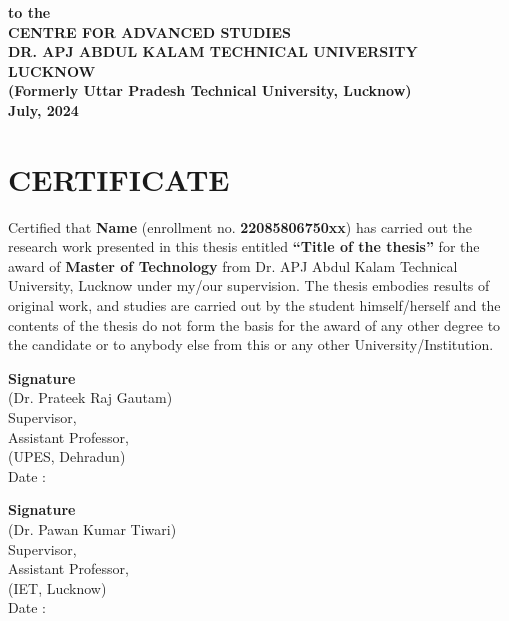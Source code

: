 \documentclass[a4paper, 12pt]{report}
\begin{document}
\begin{titlepage}
\begin{center}
			{\fontsize{12}{14}\selectfont \textbf{to the}}\\
			{\MakeUppercase{\fontsize{14}{17}\selectfont \textbf{CENTRE FOR ADVANCED STUDIES}}}\\[.5cm] %
			{\fontsize{16}{19}\selectfont \textbf{DR. APJ ABDUL KALAM TECHNICAL UNIVERSITY\\
					LUCKNOW}}\\
			{\fontsize{14}{19}\selectfont \textbf{(Formerly Uttar Pradesh Technical University, Lucknow)}}\\[1cm]
			
			{\fontsize{16}{19}\selectfont \textbf{July, 2024}} %
			
			\end{center}
		\end{titlepage} 
			
			
			
			
			\chapter*{\fontsize{14}{17}\selectfont \centering CERTIFICATE}
				\begin{doublespace}
					Certified that \textbf{Name} (enrollment no. \textbf{22085806750xx}) has carried out the research work presented in this thesis entitled \textbf{“Title of the thesis”} for the award of \textbf{Master of Technology} from Dr. APJ Abdul Kalam Technical University, Lucknow under my/our supervision. The thesis embodies results of original work, and studies are carried out by the student himself/herself and the contents of the thesis do not form the basis for the award of any other degree to the candidate or to anybody else from this or any other University/Institution.\\[1cm]
				\end{doublespace}
				
				\begin{minipage}[t]{0.5\textwidth}
					
					\textbf{Signature}\\[1.5cm]
					(Dr. Prateek Raj Gautam)\\ 
					Supervisor,\\
					Assistant Professor,\\
					(UPES, Dehradun)\\
					Date :
				\end{minipage}\hfill
				\begin{minipage}[t]{0.5\textwidth}
					
					
					\textbf{Signature}\\[1.5cm]
					(Dr. Pawan Kumar Tiwari)\\
					Supervisor,\\
					Assistant Professor,\\
					(IET, Lucknow)\\
					Date :
				\end{minipage}\\[1cm]
			
\end{document}
